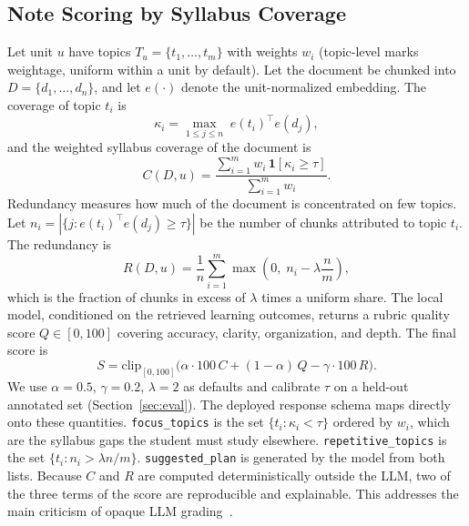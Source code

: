 \documentclass[conference]{IEEEtran}
\begin{document}
\subsection{Note Scoring by Syllabus Coverage}
Let unit $u$ have topics $T_u = \{t_1,\dots,t_m\}$ with weights $w_i$
(topic-level marks weightage, uniform within a unit by default). Let the
document be chunked into $D = \{d_1,\dots,d_n\}$, and let $e(\cdot)$ denote
the unit-normalized embedding. The coverage of topic $t_i$ is
\begin{equation}
\kappa_i = \max_{1\le j\le n} \; e(t_i)^{\top} e(d_j),
\end{equation}
and the weighted syllabus coverage of the document is
\begin{equation}
C(D,u) = \frac{\sum_{i=1}^{m} w_i \,\mathbf{1}[\kappa_i \ge \tau]}{\sum_{i=1}^{m} w_i}.
\label{eq:cov}
\end{equation}
Redundancy measures how much of the document is concentrated on few topics.
Let $n_i = |\{j : e(t_i)^{\top}e(d_j) \ge \tau\}|$ be the number of chunks
attributed to topic $t_i$. The redundancy is
\begin{equation}
R(D,u) = \frac{1}{n}\sum_{i=1}^{m} \max\!\left(0,\; n_i - \lambda\frac{n}{m}\right),
\label{eq:red}
\end{equation}
which is the fraction of chunks in excess of $\lambda$ times a uniform share.
The local model, conditioned on the retrieved learning outcomes, returns a
rubric quality score $Q \in [0,100]$ covering accuracy, clarity,
organization, and depth. The final score is
\begin{equation}
S = \mathrm{clip}_{[0,100]}\Big(\alpha \cdot 100\,C + (1-\alpha)\,Q - \gamma \cdot 100\,R\Big).
\label{eq:score}
\end{equation}
We use $\alpha{=}0.5$, $\gamma{=}0.2$, $\lambda{=}2$ as defaults and
calibrate $\tau$ on a held-out annotated set (Section~\ref{sec:eval}). The
deployed response schema maps directly onto these quantities.
\texttt{focus\_topics} is the set $\{t_i : \kappa_i < \tau\}$ ordered by
$w_i$, which are the syllabus gaps the student must study elsewhere.
\texttt{repetitive\_topics} is the set
$\{t_i : n_i > \lambda n/m\}$. \texttt{suggested\_plan} is generated by the
model from both lists. Because $C$ and $R$ are computed deterministically
outside the LLM, two of the three terms of the score are reproducible and
explainable. This addresses the main criticism of opaque LLM
grading~\cite{zheng2023judging}.
\end{document}
